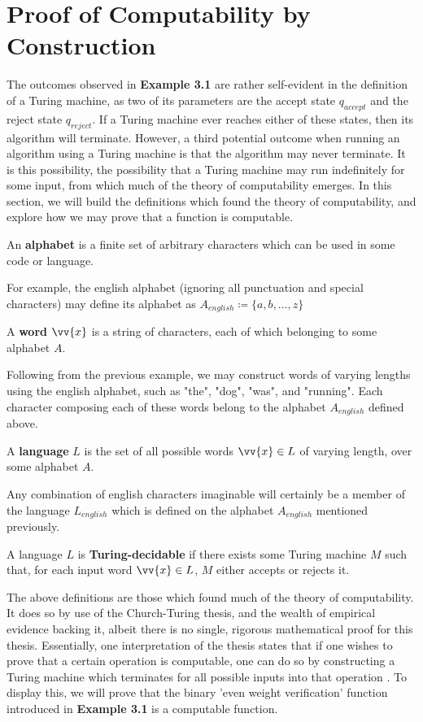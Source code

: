 \documentclass{article}
\begin{document}
\section{Proof of Computability by Construction}
The outcomes observed in \textbf{Example 3.1} are rather self-evident in the definition of a Turing machine, as two of its parameters are the accept state $q_{accept}$ and the reject state $q_{reject}$.  If a Turing machine ever reaches either of these states, then its algorithm will terminate.  However, a third potential outcome when running an algorithm using a Turing machine is that the algorithm may never terminate.  It is this possibility, the possibility that a Turing machine may run indefinitely for some input, from which much of the theory of computability emerges.  In this section, we will build the definitions which found the theory of computability, and explore how we may prove that a function is computable.
\begin{defin}
	An \textbf{alphabet} is a finite set of arbitrary characters which can be used in some code or language.
\end{defin}
\noindent For example, the english alphabet (ignoring all punctuation and special characters) may define its alphabet as $A_{english} \coloneq \{ a, b, ... , z \}$
\begin{defin}
	A \textbf{word} $\vv{x}$ is a string of characters, each of which belonging to some alphabet $A$.
\end{defin}
\noindent Following from the previous example, we may construct words of varying lengths using the english alphabet, such as "the", "dog", "was", and "running".  Each character composing each of these words belong to the alphabet $A_{english}$ defined above.
\begin{defin}
	A \textbf{language} $L$ is the set of all possible words $\vv{x} \in L$ of varying length, over some alphabet $A$.
\end{defin}
\noindent Any combination of english characters imaginable will certainly be a member of the language $L_{english}$ which is defined on the alphabet $A_{english}$ mentioned previously.
\begin{defin}
	A language $L$ is \textbf{Turing-decidable} if there exists some Turing machine $M$ such that, for each input word $\vv{x} \in L$, $M$ either accepts or rejects it. \cite{2}
\end{defin}
\noindent The above definitions are those which found much of the theory of computability.  It does so by use of the Church-Turing thesis, and the wealth of empirical evidence backing it, albeit there is no single, rigorous mathematical proof for this thesis.  Essentially, one interpretation of the thesis states that if one wishes to prove that a certain operation is computable, one can do so by constructing a Turing machine which terminates for all possible inputs into that operation \cite{4}.  To display this, we will prove that the binary 'even weight verification' function introduced in \textbf{Example 3.1} is a computable function.
\end{document}
